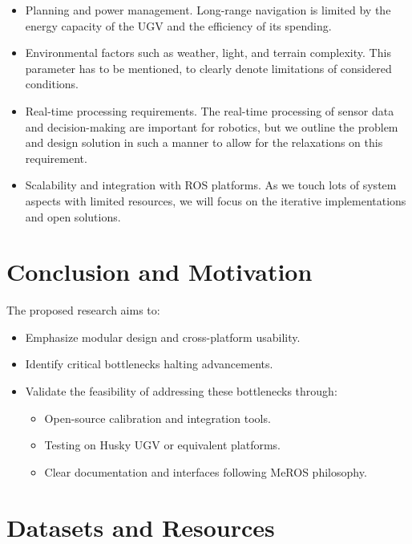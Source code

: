 \documentclass[runningheads]{llncs}
\begin{document}
\begin{itemize}
  \item Planning and power management.
        Long-range navigation is limited by the energy capacity of the UGV and the efficiency of its spending.
  \item Environmental factors such as weather, light, and terrain complexity.
        This parameter has to be mentioned, to clearly denote limitations of considered conditions.
  \item Real-time processing requirements.
        The real-time processing of sensor data and decision-making are important for robotics, but we outline the problem and design solution in such a manner to allow for the relaxations on this requirement.
  \item Scalability and integration with ROS platforms.
        As we touch lots of system aspects with limited resources, we will focus on the iterative implementations and open solutions.
\end{itemize}

\section{Conclusion and Motivation}
The proposed research aims to:
\begin{itemize}
  \item Emphasize modular design and cross-platform usability.
  \item Identify critical bottlenecks halting advancements.
  \item Validate the feasibility of addressing these bottlenecks through:
        \begin{itemize}
          \item Open-source calibration and integration tools.
          \item Testing on Husky UGV or equivalent platforms.
          \item Clear documentation and interfaces following MeROS philosophy.
        \end{itemize}
\end{itemize}

\section{Datasets and Resources}
\end{document}
